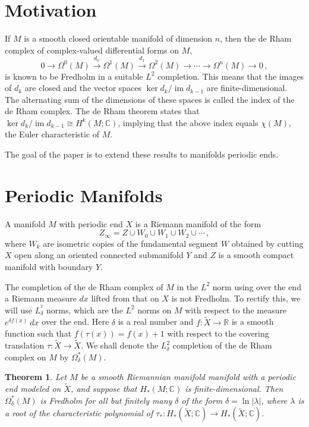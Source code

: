 \documentclass[a4paper, 12pt]{article}
\newtheorem{theorem}{Theorem}[section]
\theoremstyle{definition}
\begin{document}
\section{Motivation}

If \({ M }\) is a smooth closed orientable manifold of dimension \({ n }\), then the de Rham complex of complex-valued differential forms on \({ M }\), \[
    0 \to \Omega^{0}(M) \overset{d_0}{\to} \Omega^{1}(M) \overset{d_1}{\to} \Omega^2(M) \to \cdots \to \Omega^{n}(M) \to 0\,,
\] is known to be Fredholm in a suitable \({ L^{2} }\) completion. This means that the images of \({ d_{k} }\) are closed and the vector spaces \({ \ker d_{k} / \operatorname{im} d_{k-1} }\) are finite-dimensional. The alternating sum of the dimensions of these spaces is called the index of the de Rham complex. The de Rham theorem states that \({ \ker d_{k} / \operatorname{im} d_{k-1} \cong H^{k}(M; \mathbb C) }\), implying that the above index equals \({ \chi(M) }\), the Euler characteristic of \({ M }\).

The goal of the paper is to extend these results to manifolds periodic ends.

\section{Periodic Manifolds}

A manifold \({ M }\) with periodic end \({ X }\) is a Riemann manifold of the form \[
    Z_{\infty} = Z \cup W_0 \cup W_1 \cup W_2 \cup \cdots\,,
\] where \({ W_{k} }\) are isometric copies of the fundamental segment \({ W }\) obtained by cutting \({ X }\) open along an oriented connected submanifold \({ Y }\) and \({ Z }\) is a smooth compact manifold with boundary \({ Y }\). 

The completion of the de Rham complex of \({ M }\) in the \({ L^{2} }\) norm using over the end a Riemann measure \({ dx }\) lifted from that on \({ X }\) is not Fredholm. To rectify this, we will use \({ L_{\delta}^{^2} }\) norms, which are the \({ L^{2} }\) norms on \({ M }\) with respect to the measure \({ e^{\delta f(x)}\: dx }\) over the end. Here \({ \delta }\) is a real number and \({ f : \tilde X \to \mathbb R }\) is a smooth function such that \({ f(\tau(x)) = f(x) + 1 }\) with respect to the covering translation \({ \tau : \tilde X \to \tilde X }\). We shall denote the \({ L_{\delta}^2 }\) completion of the de Rham complex on \({ M }\) by \({ \Omega_{\delta}^*(M) }\).

\begin{theorem}
    \label{thm:Omega_delta_is_Fredholm}
    Let \({ M }\) be a smooth Riemannian manifold manifold with a periodic end modeled on \({ \tilde X }\), and suppose that \({ H_{*}(M; \mathbb C) }\) is finite-dimensional. Then \({ \Omega_{\delta}^*(M) }\) is Fredholm for all but finitely many \({ \delta }\) of the form \({ \delta = \ln \lvert \lambda \rvert }\), where \({ \lambda }\) is a root of the characteristic polynomial of \({ \tau_{*} : H_{*}(\tilde X; \mathbb C) \to H_{*}(\tilde X; \mathbb C) }\).
\end{theorem}
\end{document}
